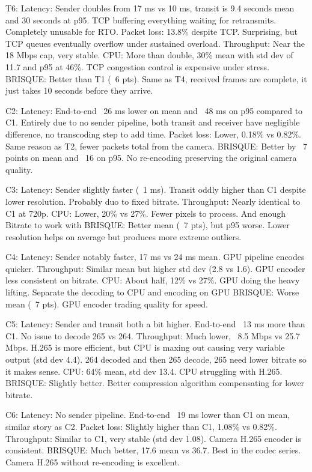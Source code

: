 T6:
Latency: Sender doubles from 17 ms vs 10 ms, transit is 9.4 seconds mean and 30 seconds at p95. TCP buffering everything waiting for retransmits. Completely unusable for RTO.
Packet loss: 13.8\% despite TCP. Surprising, but TCP queues eventually overflow under sustained overload.
Throughput: Near the 18 Mbps cap, very stable.
CPU: More than double, 30\% mean with std dev of 11.7 and p95 at 46\%. TCP congestion control is expensive under stress.
BRISQUE: Better than T1 (~6 pts). Same as T4, received frames are complete, it just takes 10 seconds before they arrive.

C2:
Latency: End-to-end ~26 ms lower on mean and ~48 ms on p95 compared to C1. Entirely due to no sender pipeline, both transit and receiver have negligible difference, no transcoding step to add time.
Packet loss: Lower, 0.18\% vs 0.82\%. Same reason as T2, fewer packets total from the camera.
BRISQUE: Better by ~7 points on mean and ~16 on p95. No re-encoding preserving the original camera quality.

C3:
Latency: Sender slightly faster (~1 ms). Transit oddly higher than C1 despite lower resolution. Probably duo to fixed bitrate.
Throughput: Nearly identical to C1 at 720p.
CPU: Lower, 20\% vs 27\%. Fewer pixels to process. And enough Bitrate to work with
BRISQUE: Better mean (~7 pts), but p95 worse. Lower resolution helps on average but produces more extreme outliers.

C4:
Latency: Sender notably faster, 17 ms vs 24 ms mean. GPU pipeline encodes quicker.
Throughput: Similar mean but higher std dev (2.8 vs 1.6). GPU encoder less consistent on bitrate.
CPU: About half, 12\% vs 27\%. GPU doing the heavy lifting. Separate the decoding to CPU and encoding on GPU
BRISQUE: Worse mean (~7 pts). GPU encoder trading quality for speed.

C5:
Latency: Sender and transit both a bit higher. End-to-end ~13 ms more than C1. No issue to decode 265 vs 264.
Throughput: Much lower, ~8.5 Mbps vs 25.7 Mbps. H.265 is more efficient, but CPU is maxing out causing very variable output (std dev 4.4). 264 decoded and then 265 decode, 265 need lower bitrate so it makes sense.
CPU: 64\% mean, std dev 13.4. CPU struggling with H.265.
BRISQUE: Slightly better. Better compression algorithm compensating for lower bitrate.

C6:
Latency: No sender pipeline. End-to-end ~19 ms lower than C1 on mean, similar story as C2.
Packet loss: Slightly higher than C1, 1.08\% vs 0.82\%.
Throughput: Similar to C1, very stable (std dev 1.08). Camera H.265 encoder is consistent.
BRISQUE: Much better, 17.6 mean vs 36.7. Best in the codec series. Camera H.265 without re-encoding is excellent.


